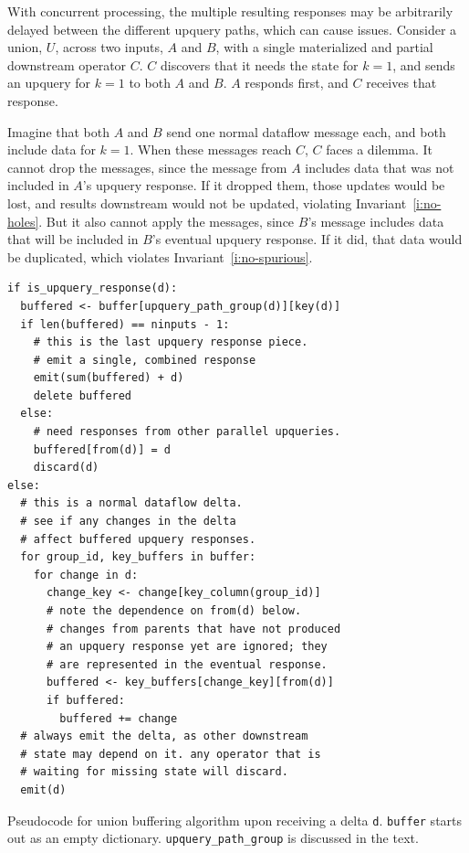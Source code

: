 With concurrent processing, the multiple resulting responses may be arbitrarily
delayed between the different upquery paths, which can cause issues. Consider a
union, $U$, across two inputs, $A$ and $B$, with a single materialized and
partial downstream operator $C$. $C$ discovers that it needs the state for $k =
1$, and sends an upquery for $k = 1$ to both $A$ and $B$. $A$ responds first,
and $C$ receives that response.

Imagine that both $A$ and $B$ send one normal dataflow message each, and both
include data for $k = 1$. When these messages reach $C$, $C$ faces a dilemma. It
cannot drop the messages, since the message from $A$ includes data that was not
included in $A$'s upquery response. If it dropped them, those updates would be
lost, and results downstream would not be updated, violating
Invariant~\ref{i:no-holes}. But it also cannot apply the messages, since $B$'s
message includes data that will be included in $B$'s eventual upquery response.
If it did, that data would be duplicated, which violates
Invariant~\ref{i:no-spurious}.

\begin{listing}
  \begin{verbatim}
if is_upquery_response(d):
  buffered <- buffer[upquery_path_group(d)][key(d)]
  if len(buffered) == ninputs - 1:
    # this is the last upquery response piece.
    # emit a single, combined response
    emit(sum(buffered) + d)
    delete buffered
  else:
    # need responses from other parallel upqueries.
    buffered[from(d)] = d
    discard(d)
else:
  # this is a normal dataflow delta.
  # see if any changes in the delta
  # affect buffered upquery responses.
  for group_id, key_buffers in buffer:
    for change in d:
      change_key <- change[key_column(group_id)]
      # note the dependence on from(d) below.
      # changes from parents that have not produced
      # an upquery response yet are ignored; they
      # are represented in the eventual response.
      buffered <- key_buffers[change_key][from(d)]
      if buffered:
        buffered += change
  # always emit the delta, as other downstream
  # state may depend on it. any operator that is
  # waiting for missing state will discard.
  emit(d)
  \end{verbatim}
  \caption{Pseudocode for union buffering algorithm upon receiving a delta
  \texttt{d}. \texttt{buffer} starts out as an empty dictionary.
  \texttt{upquery\_path\_group} is discussed in the text.}
  \label{l:union-buffer}
\end{listing}

